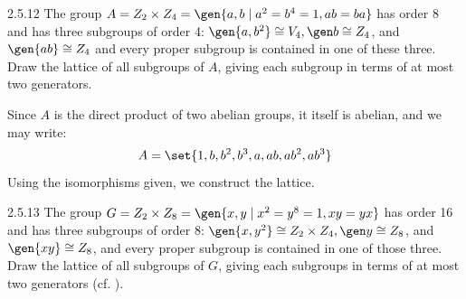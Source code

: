 \begin{exercise}{2.5.12} 
    The group $A = Z_2 \times Z_4 = \gen{a, b \mid a^2 = b^4 = 1, ab = ba}$ has order 8 and has three subgroups of order 4: $\gen{a, b^2} \cong V_4, \gen b \cong Z_4$, and $\gen{ab} \cong Z_4$ and every proper subgroup is contained in one of these three.
	Draw the lattice of all subgroups of $A$, giving each subgroup in terms of at most two generators.
\end{exercise}

\begin{sol}
    Since $A$ is the direct product of two abelian groups, it itself is abelian, and we may write:
    \[
    	A = \set{1, b, b^2, b^3, a, ab, ab^2, ab^3}
    \]
    Using the isomorphisms given, we construct the lattice.
    \begin{center}
    \end{center}
\end{sol}

\begin{exercise}{2.5.13}
    The group $G = Z_2 \times Z_8 = \gen{x, y \mid x^2 = y^8 = 1, xy = yx}$ has order 16 and has three subgroups of order 8: $\gen{x, y^2} \cong Z_2 \times Z_4, \gen y \cong Z_8$, and $\gen{xy} \cong Z_8$, and every proper subgroup is contained in one of those three.
	Draw the lattice of all subgroups of $G$, giving each subgroups in terms of at most two generators (cf. ).
\end{exercise}

